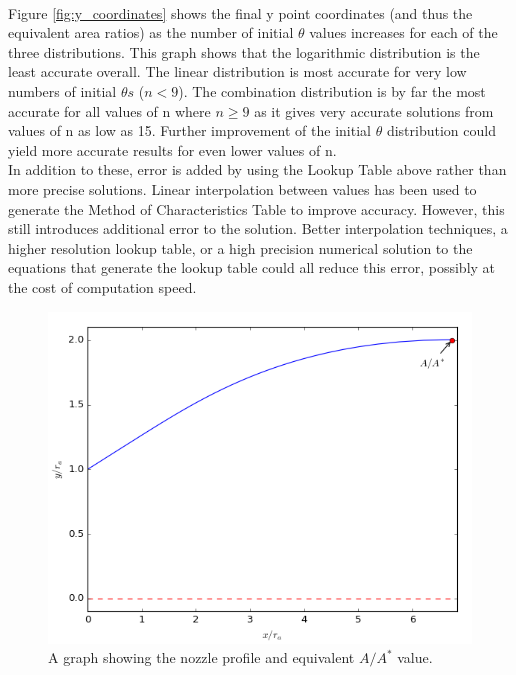 \documentclass[10pt,a4paper]{article}
\begin{document}
\\Figure \ref{fig:y_coordinates} shows the final y point coordinates (and thus the equivalent area ratios) as the number of initial $\theta$ values increases for each of the three distributions. This graph shows that the logarithmic distribution is the least accurate overall. The linear distribution is most accurate for very low numbers of initial $\theta s$ ($n < 9$). The combination distribution is by far the most accurate for all values of n where $n \geq 9$ as it gives very accurate solutions from values of n as low as 15. Further improvement of the initial $\theta$ distribution could yield more accurate results for even lower values of n.
\\In addition to these, error is added by using the Lookup Table above rather than more precise solutions. Linear interpolation between values has been used to generate the Method of Characteristics Table to improve accuracy. However, this still introduces additional error to the solution. Better interpolation techniques, a higher resolution lookup table, or a high precision numerical solution to the equations that generate the lookup table could all reduce this error, possibly at the cost of computation speed.
\begin{figure}[!htb]
\centering
\includegraphics[scale=0.75]{nozzle.png}
\caption{A graph showing the nozzle profile and equivalent $A/A^{*}$ value.}
\label{fig:nozzle_profile}
\end{figure}
\end{document}
